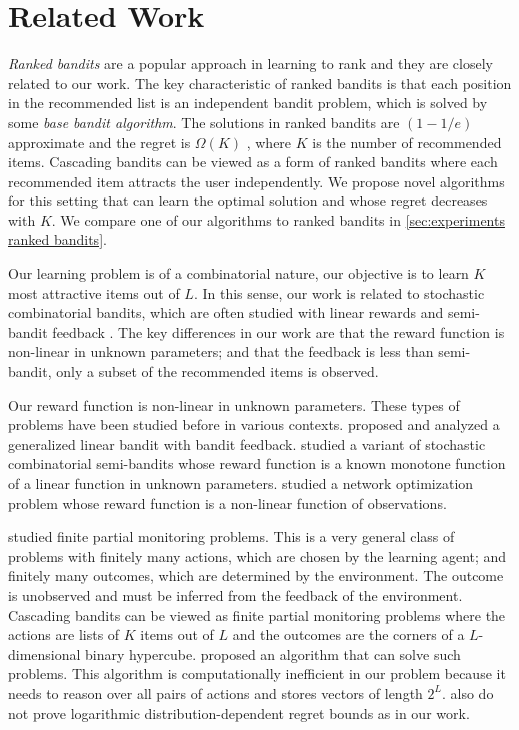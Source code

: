 
\section{Related Work}
\label{sec:related work}

\emph{Ranked bandits} are a popular approach in learning to rank \cite{radlinski08learning} and they are closely related to our work. The key characteristic of ranked bandits is that each position in the recommended list is an independent bandit problem, which is solved by some \emph{base bandit algorithm}. The solutions in ranked bandits are $(1 - 1 / e)$ approximate and the regret is $\Omega(K)$ \cite{radlinski08learning}, where $K$ is the number of recommended items. Cascading bandits can be viewed as a form of ranked bandits where each recommended item attracts the user independently. We propose novel algorithms for this setting that can learn the optimal solution and whose regret decreases with $K$. We compare one of our algorithms to ranked bandits in \cref{sec:experiments ranked bandits}.

Our learning problem is of a combinatorial nature, our objective is to learn $K$ most attractive items out of $L$. In this sense, our work is related to stochastic combinatorial bandits, which are often studied with linear rewards and semi-bandit feedback \cite{gai12combinatorial,kveton14matroid,kveton14learning,kveton15tight}. The key differences in our work are that the reward function is non-linear in unknown parameters; and that the feedback is less than semi-bandit, only a subset of the recommended items is observed.

Our reward function is non-linear in unknown parameters. These types of problems have been studied before in various contexts. \citet{filippi10parametric} proposed and analyzed a generalized linear bandit with bandit feedback. \citet{chen13combinatorial} studied a variant of stochastic combinatorial semi-bandits whose reward function is a known monotone function of a linear function in unknown parameters. \citet{le14sequential} studied a network optimization problem whose reward function is a non-linear function of observations.

\citet{bartok12adaptive} studied finite partial monitoring problems. This is a very general class of problems with finitely many actions, which are chosen by the learning agent; and finitely many outcomes, which are determined by the environment. The outcome is unobserved and must be inferred from the feedback of the environment. Cascading bandits can be viewed as finite partial monitoring problems where the actions are lists of $K$ items out of $L$ and the outcomes are the corners of a $L$-dimensional binary hypercube. \citet{bartok12adaptive} proposed an algorithm that can solve such problems. This algorithm is computationally inefficient in our problem because it needs to reason over all pairs of actions and stores vectors of length $2^L$. \citet{bartok12adaptive} also do not prove logarithmic distribution-dependent regret bounds as in our work.

